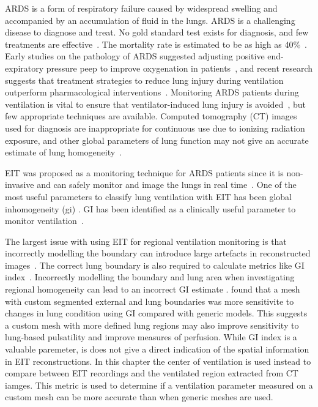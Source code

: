 ARDS is a form of
respiratory failure caused by widespread swelling and 
accompanied by an accumulation of fluid in the 
lungs. 
ARDS is a challenging disease to diagnose and treat. 
No gold standard test exists for diagnosis, 
and few treatments are 
effective~\parencite{pham_fifty_2017}. The 
mortality rate is estimated to be as high 
as 40\%~\parencite{abe_epidemiology_2018}.
Early studies on the pathology of ARDS suggested
adjusting positive end-expiratory pressure
\acrshort{peep} to improve oxygenation in 
patients~\parencite{petty_cards_2001,ashbaugh_acute_1967}, 
and recent research suggests that treatment strategies to 
reduce lung injury during ventilation outperform
pharmacological interventions~\parencite{duggal_pharmacological_2015}. 
Monitoring ARDS patients during ventilation is vital to ensure that 
ventilator-induced lung injury is avoided~\parencite{bates_ventilator-induced_2018}, 
but few appropriate techniques are available. Computed tomography (CT) images used for
diagnosis are inappropriate for continuous use due to ionizing radiation 
exposure, and other global parameters of lung function may not give an accurate
estimate of lung homogeneity~\parencite{zhao_evaluation_2009}. 

EIT was proposed
as a monitoring technique for ARDS patients since it is non-invasive 
and can safely monitor and image the lungs in 
real time~\parencite{denai_absolute_2010,frerichs_chest_2017}.
One of the most useful parameters to classify lung ventilation 
with EIT has been global inhomogeneity (\acrshort{gi})
\parencite{sribar_influence_2020,hough_effect_2016,humphreys_effect_2011,
zhao_regional_2012,hochhausen_comparison_2019,hsu_regional_2017}.
GI has been identified as a clinically useful parameter to monitor 
ventilation~\parencite{frerichs_chest_2019}.

The largest issue with using EIT for regional 
ventilation monitoring is that incorrectly modelling the 
boundary can introduce large artefacts in reconstructed
images~\parencite{grychtol_impact_2012}. The correct 
lung boundary is also required to calculate metrics like GI
index~\parencite{zhao_evaluation_2009}.
Incorrectly modelling the boundary and lung area when investigating 
regional homogeneity can lead to an incorrect GI 
estimate \parencite{yang_lung_2021}. 
 found that 
a mesh with custom segmented external and lung boundaries 
was more sensitivite to changes in lung condition using GI 
compared with generic models.
This suggests a custom mesh with more defined lung regions 
may also improve sensitivity to lung-based pulsatility and 
improve measures of perfusion. 
While GI index is a valuable paremeter, is does not 
give a direct indication of the spatial information in EIT reconstructions.
In this chapter the center of ventilation is used instead 
to compare between EIT recordings and the ventilated region extracted
from CT iamges. This metric is used to determine if 
a ventilation parameter measured on a custom mesh can be more accurate than 
when generic meshes are used.

